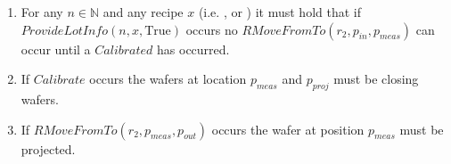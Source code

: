 \begin{enumerate}
    \item For any $n \in \mathbb{N}$ and any recipe $x$ (i.e. \recipeOne, \recipeTwo or \recipeThree) it must hold that if $\mathit{ProvideLotInfo}(n, x, \text{True})$ occurs no $\mathit{RMoveFromTo}(r_2, p_\mathit{in}, p_\mathit{meas})$ can occur until a $\mathit{Calibrated}$ has occurred.
    \item If $Calibrate$ occurs the wafers at location $p_\mathit{meas}$ and $p_\mathit{proj}$ must be closing wafers.
    \item If $\mathit{RMoveFromTo}\left(r_2, p_\mathit{meas}, p_\mathit{out}\right)$ occurs the wafer at position $p_\mathit{meas}$ must be projected.
\end{enumerate}

